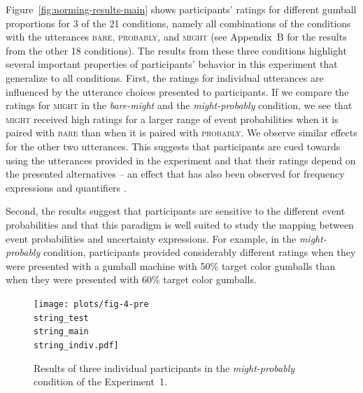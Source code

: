 Figure~\ref{fig:norming-results-main} shows participants' ratings for different gumball proportions for 3 of the 21 conditions, namely all combinations of the conditions
with the utterances \textsc{bare}, \textsc{probably}, and \textsc{might} (see Appendix~B for the results from the other 18 conditions). 
The results from these three conditions highlight several important properties of participants'
behavior in this experiment that generalize to all conditions.
First, the ratings for individual utterances are influenced by the utterance choices presented to participants.
If we compare the ratings for \textsc{might} in the \textit{bare-might} and the \textit{might-probably} condition, we see that \textsc{might} received high ratings for a larger
range of event probabilities when it is paired with \textsc{bare} than when it is paired with \textsc{probably}. We observe similar effects for the other two utterances.
This suggests that participants are cued towards using the utterances provided in the experiment and that their ratings depend on the presented alternatives -- an effect that
has also been observed for frequency expressions \cite{Chase1969} and quantifiers \cite{Degen2016}.

Second, the results suggest that participants are sensitive to the different event probabilities and that this paradigm is well suited to study 
the mapping between event probabilities and uncertainty expressions. For example, in the \textit{might-probably} condition, participants
provided considerably different ratings when they were presented with a gumball machine with 50\% target color gumballs than when they
were presented with 60\% target color gumballs.


\begin{figure}
\texttt{[image: plots/fig-4-pre\\string\_test\\string\_main\\string\_indiv.pdf]}
\caption{Results of three individual participants in the \emph{might-probably} condition of the Experiment~1. \label{fig:norming-results-indiv}}
\end{figure}


